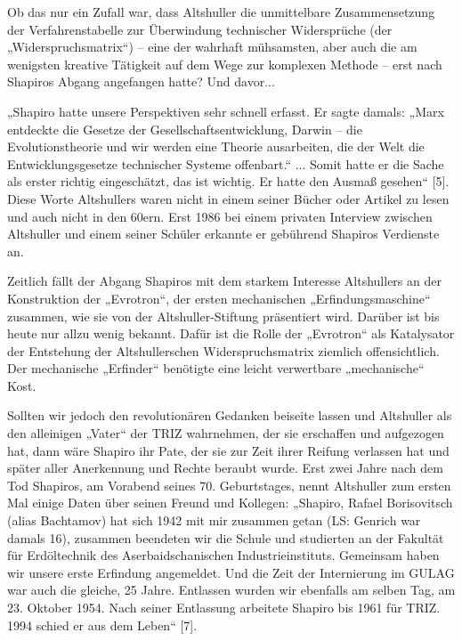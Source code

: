 \documentclass[11pt,a4paper]{article}
\begin{document}
Ob das nur ein Zufall war, dass Altshuller die unmittelbare Zusammensetzung
der Verfahrenstabelle zur Überwindung technischer Widersprüche (der
„Widerspruchsmatrix“) -- eine der wahrhaft mühsamsten, aber auch die am
wenigsten kreative Tätigkeit auf dem Wege zur komplexen Methode -- erst nach
Shapiros Abgang angefangen hatte? Und davor...

„Shapiro hatte unsere Perspektiven sehr schnell erfasst. Er sagte damals:
„Marx entdeckte die Gesetze der Gesellschaftsentwicklung, Darwin – die
Evolutionstheorie und wir werden eine Theorie ausarbeiten, die der Welt die
Entwicklungsgesetze technischer Systeme offenbart.“ ...  Somit hatte er die
Sache als erster richtig eingeschätzt, das ist wichtig. Er hatte den Ausmaß
gesehen“ [5]. Diese Worte Altshullers waren nicht in einem seiner Bücher oder
Artikel zu lesen und auch nicht in den 60ern. Erst 1986 bei einem privaten
Interview zwischen Altshuller und einem seiner Schüler erkannte er gebührend
Shapiros Verdienste an.

Zeitlich fällt der Abgang Shapiros mit dem starkem Interesse Altshullers an
der Konstruktion der „Evrotron“, der ersten mechanischen „Erfindungsmaschine“
zusammen, wie sie von der Altshuller-Stiftung präsentiert wird. Darüber ist
bis heute nur allzu wenig bekannt. Dafür ist die Rolle der „Evrotron“ als
Katalysator der Entstehung der Altshullerschen Widerspruchsmatrix ziemlich
offensichtlich. Der mechanische „Erfinder“ benötigte eine leicht verwertbare
„mechanische“ Kost.

Sollten wir jedoch den revolutionären Gedanken beiseite lassen und Altshuller
als den alleinigen „Vater“ der TRIZ wahrnehmen, der sie erschaffen und
aufgezogen hat, dann wäre Shapiro ihr Pate, der sie zur Zeit ihrer Reifung
verlassen hat und später aller Anerkennung und Rechte beraubt wurde. Erst zwei
Jahre nach dem Tod Shapiros, am Vorabend seines 70. Geburtstages, nennt
Altshuller zum ersten Mal einige Daten über seinen Freund und Kollegen:
„Shapiro, Rafael Borisovitsch (alias Bachtamov) hat sich 1942 mit mir zusammen
getan (LS: Genrich war damals 16), zusammen beendeten wir die Schule und
studierten an der Fakultät für Erdöltechnik des Aserbaidschanischen
Industrieinstituts. Gemeinsam haben wir unsere erste Erfindung angemeldet. Und
die Zeit der Internierung im GULAG war auch die gleiche, 25 Jahre.  Entlassen
wurden wir ebenfalls am selben Tag, am 23. Oktober 1954. Nach seiner
Entlassung arbeitete Shapiro bis 1961 für TRIZ. 1994 schied er aus dem Leben“
[7].
\end{document}
